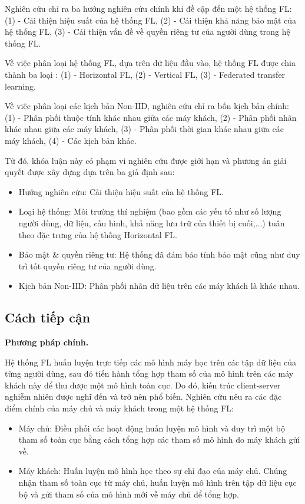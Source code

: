 Nghiên cứu \cite{yin2021comprehensive} chỉ ra ba hướng nghiên cứu chính khi đề cập đến một hệ thống FL: (1) - Cải thiện hiệu suất của hệ thống FL, (2) - Cải thiện khả năng bảo mật của hệ thống FL, (3) - Cải thiện vấn đề về quyền riêng tư của người dùng trong hệ thống FL.

Về việc phân loại hệ thống FL, dựa trên dữ liệu đầu vào, hệ thống FL được chia thành ba loại \cite{yin2021comprehensive}: (1) - Horizontal FL, (2) - Vertical FL, (3) - Federated transfer learning.

Về việc phân loại các kịch bản Non-IID, nghiên cứu \cite{zhu2021federated} chỉ ra bốn kịch bản chính: (1) - Phân phối thuộc tính khác nhau giữa các máy khách, (2) - Phân phối nhãn khác nhau giữa các máy khách, (3) - Phân phối thời gian khác nhau giữa các máy khách, (4) - Các kịch bản khác.

Từ đó, khóa luận này có phạm vi nghiên cứu được giới hạn và phương án giải quyết được xây dựng dựa trên ba giả định sau:

\begin{itemize}
    \item Hướng nghiên cứu: Cải thiện hiệu suất của hệ thống FL.
    \item Loại hệ thống: Môi trường thí nghiệm (bao gồm các yếu tố như số lượng người dùng, dữ liệu, cấu hình, khả năng lưu trữ của thiết bị cuối,...) tuân theo đặc trưng của hệ thống Horizontal FL.
    \item Bảo mật \& quyền riêng tư: Hệ thống đã đảm bảo tính bảo mật cũng như duy trì tốt quyền riêng tư của người dùng.
    \item Kịch bản Non-IID: Phân phối nhãn dữ liệu trên các máy khách là khác nhau.
\end{itemize}

\subsection*{Cách tiếp cận}

\textbf{Phương pháp chính.}

Hệ thống FL huấn luyện trực tiếp các mô hình máy học trên các tập dữ liệu của từng người dùng, sau đó tiến hành tổng hợp tham số của mô hình trên các máy khách này để thu được một mô hình toàn cục. Do đó, kiến trúc client-server nghiễm nhiên được nghĩ đến và trở nên phổ biến. Nghiên cứu \cite{yin2021comprehensive} nêu ra các đặc điểm chính của máy chủ và máy khách trong một hệ thống FL:

\begin{itemize}
    \item Máy chủ: Điều phối các hoạt động huấn luyện mô hình và duy trì một bộ tham số toàn cục bằng cách tổng hợp các tham số mô hình do máy khách gửi về.
    \item Máy khách: Huấn luyện mô hình học theo sự chỉ đạo của máy chủ. Chúng nhận tham số toàn cục từ máy chủ, huấn luyện mô hình trên tập dữ liệu cục bộ và gửi tham số của mô hình mới về máy chủ để tổng hợp.
\end{itemize}

